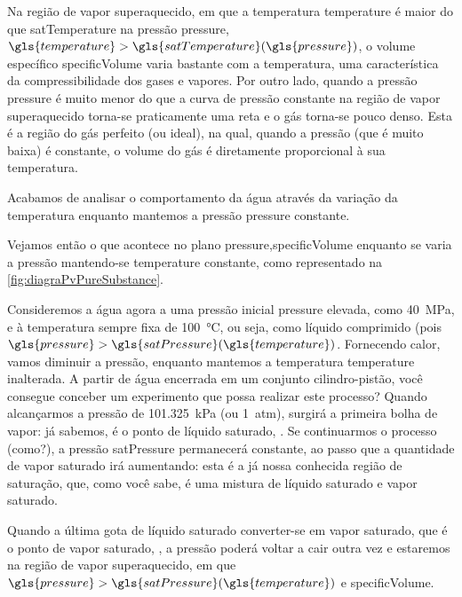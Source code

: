    Na região de vapor superaquecido, em que a temperatura \gls{temperature} é
    maior do que \gls{satTemperature} na pressão
    \gls{pressure},
    $\gls{temperature}>\gls{satTemperature}\functionOf{\gls{pressure}}$, o
    volume específico
    \gls{specificVolume} varia
    bastante com a temperatura, uma característica da compressibilidade dos
    gases e vapores. Por outro lado, quando a pressão \gls{pressure} é muito
    menor do que  a curva de pressão constante na
    região de vapor superaquecido torna-se praticamente uma reta e o gás
    torna-se pouco denso.  Esta é a região do gás perfeito (ou ideal), na qual,
    quando a pressão (que é muito baixa) é constante, o volume do gás é
    diretamente proporcional à sua temperatura.

    Acabamos de analisar o comportamento da água através da variação da
    temperatura enquanto mantemos a pressão \gls{pressure} constante.

    Vejamos então o que acontece no plano \gls{pressure},\gls{specificVolume}
    enquanto se varia a pressão mantendo-se \gls{temperature} constante, como
    representado na \cref{fig:diagraPvPureSubstance}.

    Consideremos a água agora a uma pressão inicial \gls{pressure} elevada,
    como \SI{40}{\mega\pascal}, e à temperatura sempre fixa de
    \SI{100}{\celsius}, ou seja, como líquido comprimido (pois
    $\gls{pressure}>\gls{satPressure}\functionOf{\gls{temperature}}$.
    Fornecendo calor, vamos diminuir a pressão, enquanto mantemos a temperatura
    \gls{temperature} inalterada. A partir de água encerrada em um conjunto
    cilindro-pistão, você consegue conceber um experimento que possa realizar
    este processo? Quando alcançarmos a pressão de \SI{101.325}{\kilo\pascal}
    (ou \SI{1}{atm}), surgirá a primeira bolha de vapor: já sabemos, é o ponto
    de líquido saturado,
    . Se
    continuarmos o processo (como?), a pressão
    \gls{satPressure} permanecerá constante, ao
    passo que a quantidade de vapor saturado irá aumentando: esta é a já nossa
    conhecida região de saturação, que, como você sabe, é uma mistura de
    líquido saturado e vapor saturado.

    Quando a última gota de líquido saturado converter-se em vapor saturado,
    que é o ponto de vapor saturado,
    , a pressão
    poderá voltar a cair outra vez e estaremos na região de vapor
    superaquecido, em que
    $\gls{pressure} > \gls{satPressure}\functionOf{\gls{temperature}}$ e
    \gls{specificVolume}.

